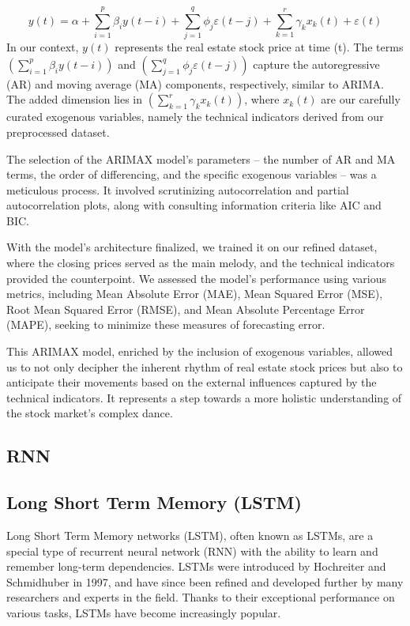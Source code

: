 \documentclass{ieeeojies}
\begin{document}
  \[y(t) = \alpha + \sum_{i=1}^{p} \beta_i y(t-i) + \sum_{j=1}^{q} \phi_j \varepsilon(t-j) + \sum_{k=1}^{r} \gamma_k x_k(t) + \varepsilon(t)\]
In our context, $y(t)$ represents the real estate stock price at time (t). The terms  $(\sum_{i=1}^{p} \beta_i y(t-i))$ and $(\sum_{j=1}^{q} \phi_j \varepsilon(t-j))$ capture the autoregressive (AR) and moving average (MA) components, respectively, similar to ARIMA. The added dimension lies in $(\sum_{k=1}^{r} \gamma_k x_k(t))$, where $x_k(t)$ are our carefully curated exogenous variables, namely the technical indicators derived from our preprocessed dataset.

The selection of the ARIMAX model's parameters – the number of AR and MA terms, the order of differencing, and the specific exogenous variables – was a meticulous process. It involved scrutinizing autocorrelation and partial autocorrelation plots, along with consulting information criteria like AIC and BIC.

With the model's architecture finalized, we trained it on our refined dataset, where the closing prices served as the main melody, and the technical indicators provided the counterpoint. We assessed the model's performance using various metrics, including Mean Absolute Error (MAE), Mean Squared Error (MSE), Root Mean Squared Error (RMSE), and Mean Absolute Percentage Error (MAPE), seeking to minimize these measures of forecasting error.

This ARIMAX model, enriched by the inclusion of exogenous variables, allowed us to not only decipher the inherent rhythm of real estate stock prices but also to anticipate their movements based on the external influences captured by the technical indicators. It represents a step towards a more holistic understanding of the stock market's complex dance.


  \subsection{RNN}
  \subsection{Long Short Term Memory (LSTM)}

   Long Short Term Memory networks (LSTM), often known as LSTMs, are a special type of recurrent neural network (RNN) with the ability to learn and remember long-term dependencies. LSTMs were introduced by Hochreiter and Schmidhuber in 1997, and have since been refined and developed further by many researchers and experts in the field. Thanks to their exceptional performance on various tasks, LSTMs have become increasingly popular.
\end{document}
